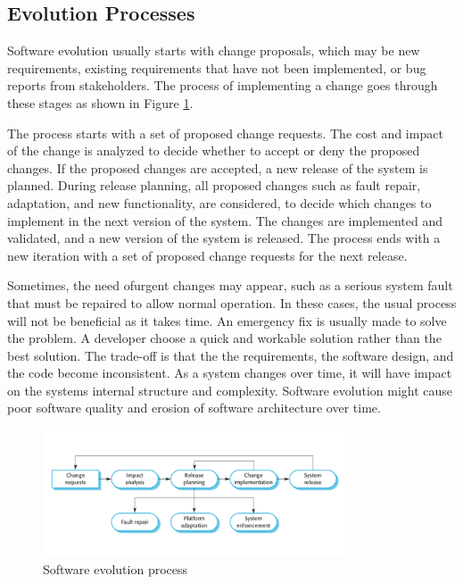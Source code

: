 \subsection{Evolution Processes}
Software evolution usually starts with change proposals, which may be new requirements, existing requirements that have not been implemented, or bug reports from stakeholders. The process of implementing a change goes through these stages\cite{Sommerville:2011:SE} as shown in Figure \ref{fig:seProcess}.

The process starts with a set of proposed change requests. The cost and impact of the change is analyzed to decide whether to accept or deny the proposed changes. If the proposed changes are accepted, a new release of the system is planned. During release planning, all proposed changes such as fault repair, adaptation, and new functionality, are considered, to decide which changes to implement in the next version of the system. The changes are implemented and validated, and a new version of the system is released. The process ends with a new iteration with a set of proposed change requests for the next release. 

Sometimes, the need ofurgent changes may appear, such as a serious system fault that must be repaired to allow normal operation. In these cases, the usual process will not be beneficial as it takes time. An emergency fix is usually made to solve the problem. A developer choose a quick and workable solution rather than the best solution. The trade-off is that the the requirements, the software design, and the code become inconsistent. As a system changes over time, it will have impact on the systems internal structure and complexity. Software evolution might cause poor software quality and erosion of software architecture over time\cite{Bass:2012:SAP:2392670}.

\begin{figure}[h!]
	\centering
	\includegraphics[width=0.8\textwidth]{images/SEprocess.png}
	\caption{Software evolution process}
	\label{fig:seProcess}
\end{figure}


